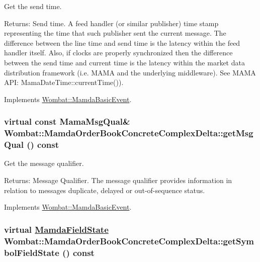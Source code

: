 Get the send time. 

\begin{Desc}
\item[Returns:]Send time. A feed handler (or similar publisher) time stamp representing the time that such publisher sent the current message. The difference between the line time and send time is the latency within the feed handler itself. Also, if clocks are properly synchronized then the difference between the send time and current time is the latency within the market data distribution framework (i.e. MAMA and the underlying middleware). See MAMA API: Mama\-Date\-Time::current\-Time()). \end{Desc}


Implements \hyperlink{classWombat_1_1MamdaBasicEvent_b0602a83bec20cd8b341ec866ff3bffa}{Wombat::Mamda\-Basic\-Event}.\hypertarget{classWombat_1_1MamdaOrderBookConcreteComplexDelta_7178498a137a11a1a3631cdd82d40c5a}{
\subsubsection[getMsgQual]{\setlength{\rightskip}{0pt plus 5cm}virtual const Mama\-Msg\-Qual\& Wombat::Mamda\-Order\-Book\-Concrete\-Complex\-Delta::get\-Msg\-Qual () const}}
\label{classWombat_1_1MamdaOrderBookConcreteComplexDelta_7178498a137a11a1a3631cdd82d40c5a}


Get the message qualifier. 

\begin{Desc}
\item[Returns:]Message Qualifier. The message qualifier provides information in relation to messages duplicate, delayed or out-of-sequence status. \end{Desc}


Implements \hyperlink{classWombat_1_1MamdaBasicEvent_675ce8f1de581548426335423d6b3864}{Wombat::Mamda\-Basic\-Event}.\hypertarget{classWombat_1_1MamdaOrderBookConcreteComplexDelta_a7d88a2ded807a8f7a6f951cda7f0632}{
\subsubsection[getSymbolFieldState]{\setlength{\rightskip}{0pt plus 5cm}virtual \hyperlink{namespaceWombat_93aac974f2ab713554fd12a1fa3b7d2a}{Mamda\-Field\-State} Wombat::Mamda\-Order\-Book\-Concrete\-Complex\-Delta::get\-Symbol\-Field\-State () const}}
\label{classWombat_1_1MamdaOrderBookConcreteComplexDelta_a7d88a2ded807a8f7a6f951cda7f0632}


